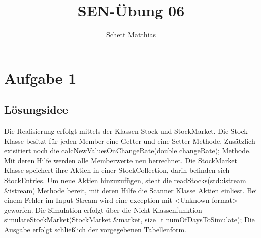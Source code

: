 \documentclass[a4paper,oneside,openany]{tufte-book}
\author{Schett Matthias}
\title{SEN-\"{U}bung 06}
\begin{document}


\frontmatter

\maketitle
\tableofcontents
\mainmatter

\chapter{Aufgabe 1}\label{chap:Auf1}

\section{L\"{o}sungsidee}

Die Realisierung erfolgt mittels der Klassen Stock und StockMarket.
Die Stock Klasse besitzt für jeden Member
eine Getter und eine Setter Methode. Zusätzlich exisitiert noch die calcNewValuesOnChangeRate(double changeRate); Methode. Mit deren Hilfe werden alle Memberwerte neu berrechnet.
Die StockMarket Klasse speichert ihre Aktien in einer StockCollection, darin befinden sich StockEntries.
Um neue Aktien hinzuzufügen, steht die readStocks(std::istream \&istream) Methode bereit, mit deren Hilfe die Scanner Klasse Aktien einliest. Bei einem Fehler im Input Stream wird eine exception mit <Unknown format> geworfen.
Die Simulation erfolgt über die Nicht Klassenfunktion simulateStockMarket(StockMarket \&market, size\_t numOfDaysToSimulate);
Die Ausgabe erfolgt schließlich der vorgegebenen Tabellenform.
\end{document}

